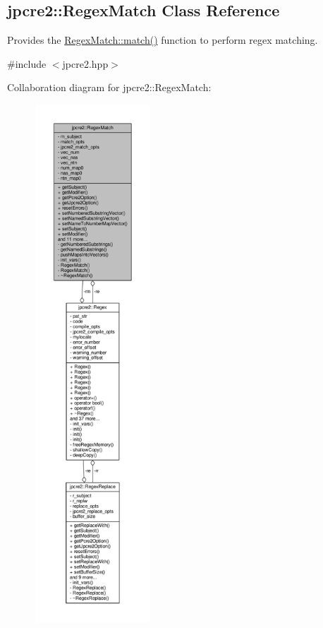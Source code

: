 \hypertarget{classjpcre2_1_1RegexMatch}{}\subsection{jpcre2\+:\+:Regex\+Match Class Reference}
\label{classjpcre2_1_1RegexMatch}


Provides the \hyperlink{classjpcre2_1_1RegexMatch_a5868aef3a146594ea1ebef34d122bb33_a5868aef3a146594ea1ebef34d122bb33}{Regex\+Match\+::match()} function to perform regex matching.  




{\ttfamily \#include $<$jpcre2.\+hpp$>$}



Collaboration diagram for jpcre2\+:\+:Regex\+Match\+:\nopagebreak
\begin{figure}[H]
\begin{center}
\leavevmode
\includegraphics[height=550pt]{classjpcre2_1_1RegexMatch__coll__graph}
\end{center}
\end{figure}
